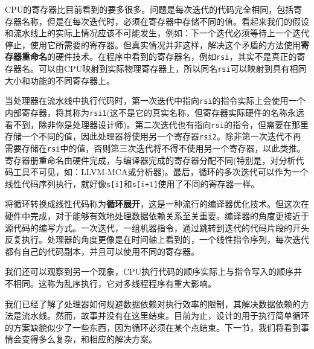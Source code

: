 CPU的寄存器比目前看到的要多很多。问题是每次迭代的代码完全相同，包括寄存器名称，但是在每次迭代时，必须在寄存器中存储不同的值。看起来我们的假设和流水线上的实际上情况应该不可能发生，例如：下一个迭代必须等待上一个迭代停止，使用它所需要的寄存器。但真实情况并非这样，解决这个矛盾的方法使用\textbf{寄存器重命名}的硬件技术。在程序中看到的寄存器名，例如\texttt{rsi}，其实不是真正的寄存器名。可以由CPU映射到实际物理寄存器上，所以同名\texttt{rsi}可以映射到具有相同大小和功能的不同寄存器上。

当处理器在流水线中执行代码时，第一次迭代中指向\texttt{rsi}的指令实际上会使用一个内部寄存器，将其称为\texttt{rsi1}(这不是它的真实名称，但寄存器实际硬件的名称永远看不到，除非你是处理器设计师)。第二次迭代也有指向\texttt{rsi}的指令，但需要在那里存储一个不同的值，因此处理器将使用另一个寄存器\texttt{rsi2}。除非第一次迭代不再需要存储在\texttt{rsi}中的值，否则第三次迭代将不得不使用另一个寄存器，以此类推。寄存器册重命名由硬件完成，与编译器完成的寄存器分配不同(特别是，对分析代码工具不可见，如：LLVM-MCA或分析器)。最后，循环的多次迭代可以作为一个线性代码序列执行，就好像\texttt{s[i]}和\texttt{s[i+1]}使用了不同的寄存器一样。

将循环转换成线性代码称为\textbf{循环展开}，这是一种流行的编译器优化技术。但这次在硬件中完成，对于能够有效地处理数据依赖关系至关重要。编译器的角度更接近于源代码的编写方式。一次迭代，一组机器指令，通过跳转到迭代的代码片段的开头反复执行。处理器的角度更像是在时间轴上看到的，一个线性指令序列，每次迭代都有自己的代码副本，并且可以使用不同的寄存器。

我们还可以观察到另一个现象，CPU执行代码的顺序实际上与指令写入的顺序并不相同。这称为乱序执行，它对多线程程序有重大影响。

我们已经了解了处理器如何规避数据依赖对执行效率的限制，其解决数据依赖的方法是流水线。然而，故事并没有在这里结束。目前为止，设计的用于执行简单循环的方案缺貌似少了一些东西，因为循环必须在某个点结束。下一节，我们将看到事情会变得多么复杂，和相应的解决方案。
























